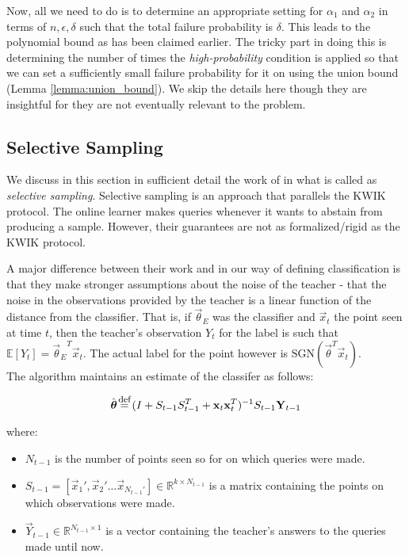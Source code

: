 Now, all we need to do is to determine an appropriate setting for $\alpha_1$ and $\alpha_2$ in terms of $n, \epsilon, \delta$ such that the total failure probability is $\delta$. This leads to the polynomial bound as has been claimed earlier. The tricky part in doing this is determining the number of times the \textit{high-probability} condition is applied so that we can set a sufficiently small failure probability for it on using the union bound (Lemma \ref{lemma:union_bound}). We skip the details here though they are insightful for they are not eventually relevant to the problem. 





\subsection{Selective Sampling}
\label{sec:selec_sampling}
We discuss in this section in sufficient detail the work of \citet{Cesa-Bianchi:2009:RBC:1553374.1553390} in what is called as \textit{selective sampling}. Selective sampling is an approach that parallels the KWIK protocol. The online learner makes queries whenever it wants to abstain from producing a sample. However, their guarantees are not as formalized/rigid as the KWIK protocol. 

A major difference between their work and in our way of defining classification is that they make stronger assumptions about the noise of the teacher - that the noise in the observations provided by the teacher is a linear function of the distance from the classifier. That is, if $\vec{\theta}_E$ was the classifier and $\vec{x}_t$ the point seen at time $t$, then the teacher's observation $Y_t$ for the label is such that $\mathbb{E}[Y_t] = {\vec{\theta}_E}^T \vec{x}_{t}$.  	The actual label for the point however is $\text{SGN}({\vec{\theta}}^T\vec{x}_t)$.\\

The algorithm maintains an estimate of the classifer as follows:

\begin{equation}
\label{eq:selec}
\hat{\vec{\theta}} \defeq (I + S_{t-1}S_{t-1}^T + \vec{x}_t \vec{x}_t ^T)^{-1} S_{t-1} \vec{Y}_{t-1}
\end{equation}

where:

\begin{itemize}
\item $N_{t-1}$ is the number of points seen so for on which queries were made.
\item $S_{t-1} = \left[\vec{x}_1', \vec{x}_2' \hdots \vec{x}_{N_{t-1}'} \right] \in \mathbb{R}^{k \times N_{t-1}}$ is  a matrix containing the points on which observations were made.
\item $\vec{Y}_{t-1} \in \mathbb{R}^{N_{t-1} \times 1}$ is a vector containing the teacher's answers to  the queries made until now.
\end{itemize}


